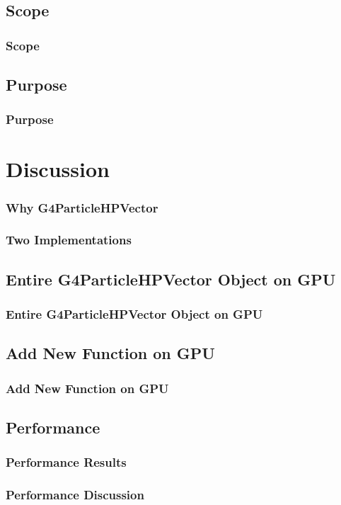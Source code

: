 \documentclass{beamer}
\begin{document}
\subsection{Scope}
\begin{frame}
\frametitle{Scope}
\end{frame}

\subsection{Purpose}
\begin{frame}
\frametitle{Purpose}
\end{frame}

\section{Discussion}

\begin{frame}
\frametitle{Why G4ParticleHPVector}
\end{frame}

\begin{frame}
\frametitle{Two Implementations}
\end{frame}

\subsection{Entire G4ParticleHPVector Object on GPU}
\begin{frame}
\frametitle{Entire G4ParticleHPVector Object on GPU}
\end{frame}

\subsection{Add New Function on GPU}
\begin{frame}
\frametitle{Add New Function on GPU}
\end{frame}

\subsection{Performance}
\begin{frame}
\frametitle{Performance Results}
\end{frame}

\begin{frame}
\frametitle{Performance Discussion}
\end{frame}
\end{document}
